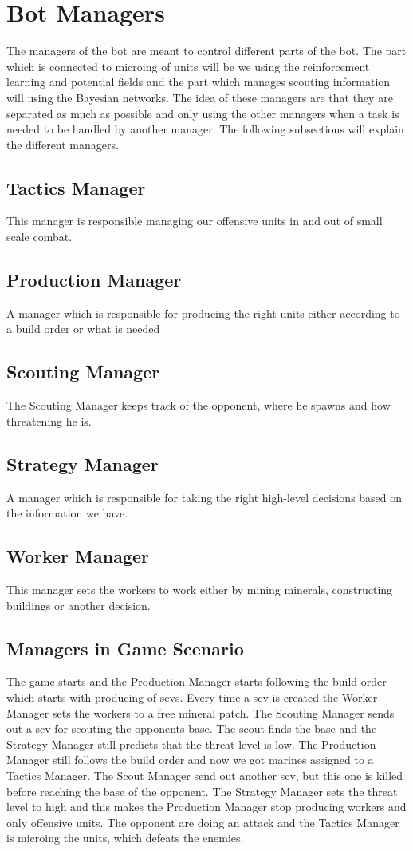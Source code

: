 \section{Bot Managers}
	\label{design::managers}
	The managers of the bot are meant to control different parts of the bot. The part which is connected to microing of units will be we using the 
	reinforcement learning and potential fields and the part which manages scouting information will using the Bayesian networks. 
	The idea of these managers are that they are separated as much as possible and only using the other managers when a task is needed to be handled 
	by another manager. The following subsections will explain the different managers.
	
	\subsection*{Tactics Manager}
		This manager is responsible managing our offensive units in and out of small scale combat.
	\subsection*{Production Manager}
		A manager which is responsible for producing the right units either according to a build order or what is needed
	\subsection*{Scouting Manager}
		The Scouting Manager keeps track of the opponent, where he spawns and how threatening he is.
	\subsection*{Strategy Manager}
		A manager which is responsible for taking the right high-level decisions based on the information we have.
	\subsection*{Worker Manager}
		This manager sets the workers to work either by mining minerals, constructing buildings or another decision.

	\subsection{Managers in Game Scenario}
		The game starts and the Production Manager starts following the build order which starts with producing of scvs. Every time a scv is created the 
		Worker Manager sets the workers to a free mineral patch. The Scouting Manager sends out a scv for scouting the opponents base. The scout 
		finds the base and the Strategy Manager still predicts that the threat level is low. The Production Manager still follows the build order and now 
		we got marines assigned to a Tactics Manager. The Scout Manager send out another scv, but this one is killed before reaching the base of the 
		opponent. The Strategy Manager sets the threat level to high and this makes the Production Manager stop producing workers and only offensive units. 
		The opponent are doing an attack and the Tactics Manager is microing the units, which defeats the enemies.
